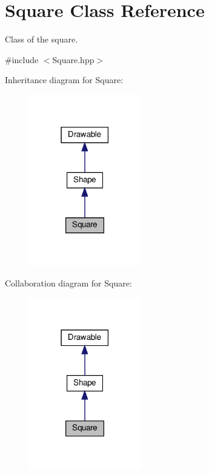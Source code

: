 \hypertarget{classSquare}{}\section{Square Class Reference}
\label{classSquare}


Class of the square.  




{\ttfamily \#include $<$Square.\+hpp$>$}



Inheritance diagram for Square\+:
\nopagebreak
\begin{figure}[H]
\begin{center}
\leavevmode
\includegraphics[width=138pt]{classSquare__inherit__graph}
\end{center}
\end{figure}


Collaboration diagram for Square\+:
\nopagebreak
\begin{figure}[H]
\begin{center}
\leavevmode
\includegraphics[width=138pt]{classSquare__coll__graph}
\end{center}
\end{figure}
